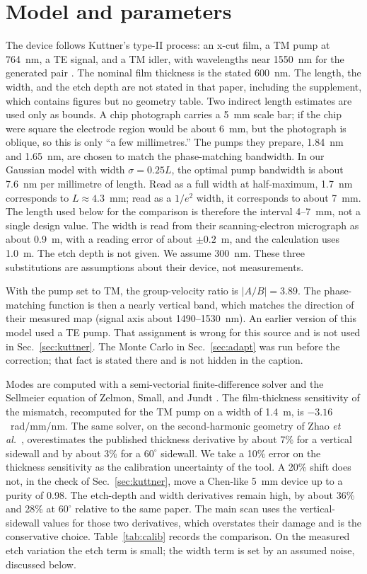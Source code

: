 \documentclass[11pt,a4paper]{article}
\begin{document}
\section{Model and parameters}
\label{sec:model}
The device follows Kuttner's type-II process: an x-cut film, a TM pump at 764~nm, a TE signal, and a TM idler, with wavelengths near 1550~nm for the generated pair \cite{Kuttner2026}.
The nominal film thickness is the stated 600~nm.
The length, the width, and the etch depth are not stated in that paper, including the supplement, which contains figures but no geometry table.
Two indirect length estimates are used only as bounds.
A chip photograph carries a 5~mm scale bar; if the chip were square the electrode region would be about 6~mm, but the photograph is oblique, so this is only ``a few millimetres.''
The pumps they prepare, 1.84~nm and 1.65~nm, are chosen to match the phase-matching bandwidth.
In our Gaussian model with width $\sigma=0.25L$, the optimal pump bandwidth is about 7.6~nm per millimetre of length.
Read as a full width at half-maximum, 1.7~nm corresponds to $L\approx 4.3$~mm; read as a $1/e^{2}$ width, it corresponds to about 7~mm.
The length used below for the comparison is therefore the interval 4--7~mm, not a single design value.
The width is read from their scanning-electron micrograph as about 0.9~\textmu m, with a reading error of about $\pm 0.2$~\textmu m, and the calculation uses 1.0~\textmu m.
The etch depth is not given.
We assume 300~nm.
These three substitutions are assumptions about their device, not measurements.

With the pump set to TM, the group-velocity ratio is $|A/B|=3.89$.
The phase-matching function is then a nearly vertical band, which matches the direction of their measured map (signal axis about 1490--1530~nm).
An earlier version of this model used a TE pump.
That assignment is wrong for this source and is not used in Sec.~\ref{sec:kuttner}.
The Monte Carlo in Sec.~\ref{sec:adapt} was run before the correction; that fact is stated there and is not hidden in the caption.

Modes are computed with a semi-vectorial finite-difference solver and the Sellmeier equation of Zelmon, Small, and Jundt \cite{Zelmon1997}.
The film-thickness sensitivity of the mismatch, recomputed for the TM pump on a width of 1.4~\textmu m, is $-3.16$~rad/mm/nm.
The same solver, on the second-harmonic geometry of Zhao \emph{et al.}\ \cite{ZhaoLu2023}, overestimates the published thickness derivative by about 7\% for a vertical sidewall and by about 3\% for a $60^{\circ}$ sidewall.
We take a 10\% error on the thickness sensitivity as the calibration uncertainty of the tool.
A 20\% shift does not, in the check of Sec.~\ref{sec:kuttner}, move a Chen-like 5~mm device up to a purity of 0.98.
The etch-depth and width derivatives remain high, by about 36\% and 28\% at $60^{\circ}$ relative to the same paper.
The main scan uses the vertical-sidewall values for those two derivatives, which overstates their damage and is the conservative choice.
Table~\ref{tab:calib} records the comparison.
On the measured etch variation the etch term is small; the width term is set by an assumed noise, discussed below.
\end{document}

